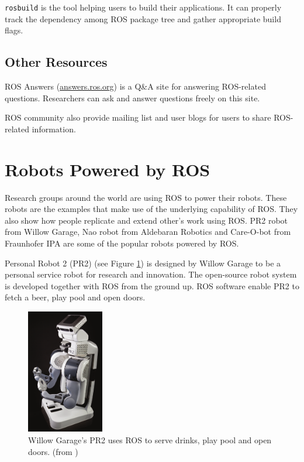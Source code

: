 \documentclass[a4paper, 10pt, conference]{ieeeconf}       %
\begin{document}
\texttt{rosbuild} is the tool helping users to build their applications. It can properly track the dependency among ROS package tree and gather appropriate build flags.

\subsection{Other Resources}
ROS Answers (\url{answers.ros.org}) is a Q\&A site for answering ROS-related questions. Researchers can ask and answer questions freely on this site.

ROS community also provide mailing list and user blogs for users to share ROS-related information.

\section{Robots Powered by ROS}

Research groups around the world are using ROS to power their robots. These robots are the examples that make use of the underlying capability of ROS. They also show how people replicate and extend other's work using ROS. PR2 robot from Willow Garage, Nao robot from Aldebaran Robotics and Care-O-bot from Fraunhofer IPA are some of the popular robots powered by ROS.

Personal Robot 2 (PR2) (see Figure \ref{fig:pr2}) is designed by Willow Garage to be a personal service robot for research and innovation. The open-source robot system is developed together with ROS from the ground up. ROS software enable PR2 to fetch a beer, play pool and open doors. 

\begin{figure}[htpb]
  \centering
  \includegraphics[width=0.30\textwidth]{share-003}
  \caption{Willow Garage's PR2 uses ROS to serve drinks, play pool and open doors. (from \cite{cousins_sharing_2010})}
  \label{fig:pr2}
\end{figure}
\end{document}

